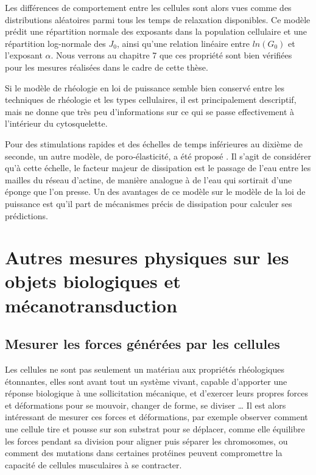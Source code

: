 \documentclass{report}
\begin{document}
 Les différences de comportement entre les cellules sont alors vues comme des distributions aléatoires parmi tous les temps de relaxation disponibles. Ce modèle prédit une répartition normale des exposants dans la population cellulaire et une répartition log-normale des $J_0$, ainsi qu'une relation linéaire entre $ln(G_0)$ et l'exposant $\alpha$. Nous verrons au chapitre 7 que ces propriété sont bien vérifiées pour les mesures réalisées dans le cadre de cette thèse. 

Si le modèle de rhéologie en loi de puissance semble bien conservé entre les techniques de rhéologie et les types cellulaires, il est principalement descriptif, mais ne donne que très peu d'informations sur ce qui se passe effectivement à l'intérieur du cytosquelette. 

Pour des stimulations rapides et des échelles de temps inférieures au dixième de seconde, un autre modèle, de poro-élasticité, a été proposé \cite{Moeendarbary}. 
Il s'agit de considérer qu'à cette échelle, le facteur majeur de dissipation est le passage de l'eau entre les mailles du réseau d'actine, de manière analogue à de l'eau qui sortirait d'une éponge que l'on presse.  
Un des avantages de ce modèle sur le modèle de la loi de puissance est qu'il part de mécanismes précis de dissipation pour calculer ses prédictions. 

\section{Autres mesures physiques sur les objets biologiques et mécanotransduction}

 



\subsection{Mesurer les forces générées par les cellules}

Les cellules ne sont pas seulement un matériau aux propriétés rhéologiques étonnantes, elles sont avant tout un système vivant, capable d'apporter une réponse biologique à une sollicitation mécanique, et d'exercer leurs propres forces et déformations pour se mouvoir, changer de forme, se diviser \dots 
Il est alors intéressant de mesurer ces forces et déformations, par exemple observer comment une cellule tire et pousse sur son substrat pour se déplacer, comme elle équilibre les forces pendant sa division pour aligner puis séparer les chromosomes, ou comment des mutations dans certaines protéines peuvent compromettre la capacité de cellules musculaires à se contracter.
\end{document}
